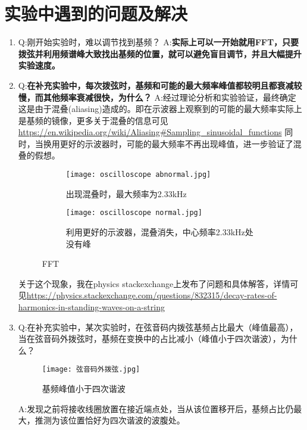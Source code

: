 \documentclass[11pt]{article}
\begin{document}
\section{实验中遇到的问题及解决}
\begin{enumerate}
	\item Q:刚开始实验时，难以调节找到基频？ \newline
	A:\textbf{实际上可以一开始就用FFT，只要拨弦并利用频谱峰大致找出基频的位置，就可以避免盲目调节，并且大幅提升实验速度。}
	\item Q:\textbf{在补充实验中，每次拨弦时，基频和可能的最大频率峰值都较明且都衰减较慢，而其他频率衰减很快，为什么？}\newline
	A:经过理论分析和实验验证，最终确定这是由于混叠(aliasing)造成的。即在示波器上观察到的可能的最大频率实际上是基频的镜像，更多关于混叠的信息可见 \url{https://en.wikipedia.org/wiki/Aliasing#Sampling_sinusoidal_functions}\newline
	同时，当换用更好的示波器时，可能的最大频率不再出现峰值，进一步验证了混叠的假想。
\begin{figure}[H]
	\centering
	\begin{subfigure}[t]{0.45\textwidth}  %
		\centering
		\texttt{[image: oscilloscope abnormal.jpg]}  %
		\caption{出现混叠时，最大频率为2.33kHz}
		\label{fig:aliasing FFT}
	\end{subfigure}
	\begin{subfigure}[t]{0.45\textwidth}  %
		\centering
		\texttt{[image: oscilloscope normal.jpg]}  %
		\caption{利用更好的示波器，混叠消失，中心频率2.33kHz处没有峰}
		\label{fig:normal FFT}
	\end{subfigure}
	\caption{FFT}
	\label{fig:FFT}
\end{figure}
关于这个现象，我在physics stackexchange上发布了问题和具体解答，详情可见\url{https://physics.stackexchange.com/questions/832315/decay-rates-of-harmonics-in-standing-waves-on-a-string}


	\item Q:在补充实验中，某次实验时，在弦音码内拨弦基频占比最大（峰值最高），当在弦音码外拨弦时，基频在变换中的占比减小（峰值小于四次谐波），为什么？\newline
	\begin{figure}[H]
		\centering
		\texttt{[image: 弦音码外拨弦.jpg]}
		\caption{基频峰值小于四次谐波}
		\label{fig:Q2}
	\end{figure}	
	A:发现之前将接收线圈放置在接近端点处，当从该位置移开后，基频占比仍最大，推测为该位置恰好为四次谐波的波腹处。
\end{enumerate}
\setcounter{section}{0}
\end{document}
